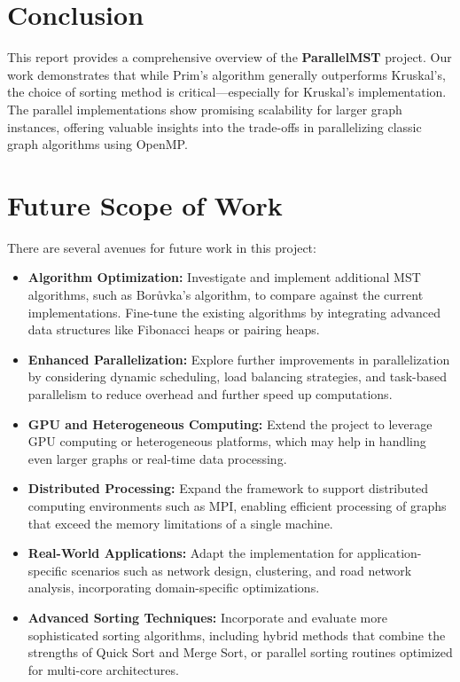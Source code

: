 \documentclass[11pt]{article}
\begin{document}
\section{Conclusion}
This report provides a comprehensive overview of the \textbf{ParallelMST} project. Our work demonstrates that while Prim's algorithm generally outperforms Kruskal's, the choice of sorting method is critical—especially for Kruskal's implementation. The parallel implementations show promising scalability for larger graph instances, offering valuable insights into the trade-offs in parallelizing classic graph algorithms using OpenMP.

\section{Future Scope of Work}
There are several avenues for future work in this project:
\begin{itemize}
    \item \textbf{Algorithm Optimization:} Investigate and implement additional MST algorithms, such as Borůvka's algorithm, to compare against the current implementations. Fine-tune the existing algorithms by integrating advanced data structures like Fibonacci heaps or pairing heaps.
    \item \textbf{Enhanced Parallelization:} Explore further improvements in parallelization by considering dynamic scheduling, load balancing strategies, and task-based parallelism to reduce overhead and further speed up computations.
    \item \textbf{GPU and Heterogeneous Computing:} Extend the project to leverage GPU computing or heterogeneous platforms, which may help in handling even larger graphs or real-time data processing.
    \item \textbf{Distributed Processing:} Expand the framework to support distributed computing environments such as MPI, enabling efficient processing of graphs that exceed the memory limitations of a single machine.
    \item \textbf{Real-World Applications:} Adapt the implementation for application-specific scenarios such as network design, clustering, and road network analysis, incorporating domain-specific optimizations.
    \item \textbf{Advanced Sorting Techniques:} Incorporate and evaluate more sophisticated sorting algorithms, including hybrid methods that combine the strengths of Quick Sort and Merge Sort, or parallel sorting routines optimized for multi-core architectures.
\end{itemize}
\end{document}
